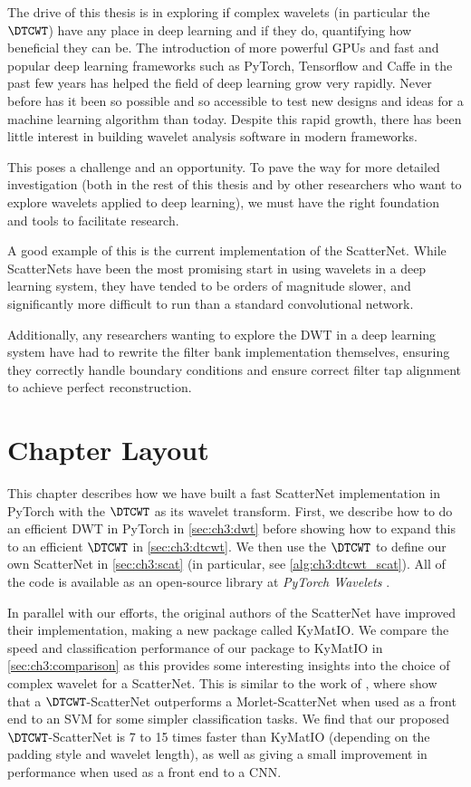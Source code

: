 The drive of this thesis is in exploring if complex wavelets (in
particular the $\DTCWT$) have any place in deep learning and if they do,
quantifying how beneficial they can be. The introduction of more powerful GPUs and
fast and popular deep learning frameworks such as PyTorch, Tensorflow and Caffe
in the past few years has helped the field of deep learning grow very rapidly.
Never before has it been so possible and so accessible to test new designs and
ideas for a machine learning algorithm than today. Despite this rapid growth,
there has been little interest in building wavelet analysis software in modern
frameworks.

This poses a challenge and an opportunity. To pave the way for more detailed
investigation (both in the rest of this thesis and by other researchers
who want to explore wavelets applied to deep learning), we must have the right
foundation and tools to facilitate research.

A good example of this is the current implementation of the ScatterNet. While
ScatterNets have been the most promising start in using wavelets in a deep
learning system, they have tended to be orders of magnitude slower, and significantly more
difficult to run than a standard convolutional network.

Additionally, any researchers wanting to explore the DWT in a deep learning
system have had to rewrite the filter bank implementation themselves, ensuring they
correctly handle boundary conditions and ensure correct filter tap alignment to
achieve perfect reconstruction.

\section{Chapter Layout}
This chapter describes how we have built a fast ScatterNet implementation in
PyTorch with the $\DTCWT$ as its wavelet transform. First, we describe how to do an
efficient DWT in PyTorch in \autoref{sec:ch3:dwt} before showing how to expand this
to an efficient $\DTCWT$ in \autoref{sec:ch3:dtcwt}.
We then use the $\DTCWT$ to define our own ScatterNet in \autoref{sec:ch3:scat} (in
particular, see \autoref{alg:ch3:dtcwt_scat}). 
All of the code is available as an open-source library at \emph{PyTorch Wavelets} \cite{cotter_pytorch_2018}.

In parallel with our efforts, the original authors of the ScatterNet have
improved their implementation, making a new package called KyMatIO\cite{andreux_kymatio:_2018}. 
We compare the speed and classification performance of our package to KyMatIO in \autoref{sec:ch3:comparison}
as this provides some interesting insights into the choice of complex wavelet
for a ScatterNet. This is similar to the work of
\cite{singh_multi-resolution_2016}, where
\citeauthor{singh_multi-resolution_2016} show that a $\DTCWT$-ScatterNet
outperforms a Morlet-ScatterNet when used as a front end to an
SVM for some simpler classification tasks.
We find that our proposed $\DTCWT$-ScatterNet is 7 to 15 times faster 
than KyMatIO (depending on the padding style and wavelet length), as well as
giving a small improvement in performance when used as a front end to a CNN.

